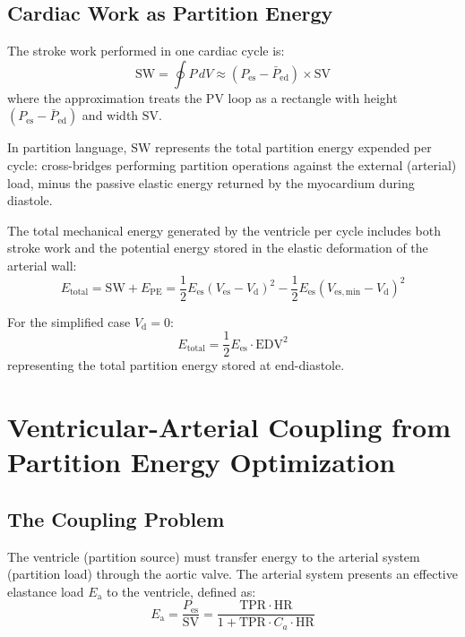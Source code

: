 \documentclass[12pt,a4paper]{article}
\theoremstyle{remark}
\newcommand{\Ees}{E_{\mathrm{es}}}
\newcommand{\Ea}{E_{\mathrm{a}}}
\newcommand{\Vd}{V_{\mathrm{d}}}
\newcommand{\Pes}{P_{\mathrm{es}}}
\newcommand{\SV}{\mathrm{SV}}
\newcommand{\HR}{\mathrm{HR}}
\newcommand{\TPR}{\mathrm{TPR}}
\newcommand{\EDV}{\mathrm{EDV}}
\newcommand{\SW}{\mathrm{SW}}
\begin{document}
\subsection{Cardiac Work as Partition Energy}

The stroke work performed in one cardiac cycle is:
\begin{equation}
    \SW = \oint P \, dV \approx (P_{\mathrm{es}} - \bar{P}_{\mathrm{ed}}) \times \SV
    \label{eq:sw}
\end{equation}
where the approximation treats the PV loop as a rectangle with height $(P_{\mathrm{es}} - \bar{P}_{\mathrm{ed}})$ and width $\SV$.

In partition language, $\SW$ represents the total partition energy expended per cycle: cross-bridges performing partition operations against the external (arterial) load, minus the passive elastic energy returned by the myocardium during diastole.

The total mechanical energy generated by the ventricle per cycle includes both stroke work and the potential energy stored in the elastic deformation of the arterial wall:
\begin{equation}
    E_{\mathrm{total}} = \SW + E_{\mathrm{PE}} = \frac{1}{2}\Ees(V_{\mathrm{es}} - \Vd)^2 - \frac{1}{2}\Ees(V_{\mathrm{es,min}} - \Vd)^2
    \label{eq:total_energy}
\end{equation}

For the simplified case $\Vd = 0$:
\begin{equation}
    E_{\mathrm{total}} = \frac{1}{2}\Ees \cdot \EDV^2
    \label{eq:total_energy_simple}
\end{equation}
representing the total partition energy stored at end-diastole.

\section{Ventricular-Arterial Coupling from Partition Energy Optimization}
\label{sec:coupling}

\subsection{The Coupling Problem}

The ventricle (partition source) must transfer energy to the arterial system (partition load) through the aortic valve. The arterial system presents an effective elastance load $\Ea$ to the ventricle, defined as:
\begin{equation}
    \Ea = \frac{\Pes}{\SV} = \frac{\TPR \cdot \HR}{1 + \TPR \cdot C_a \cdot \HR}
    \label{eq:Ea}
\end{equation}
\end{document}
